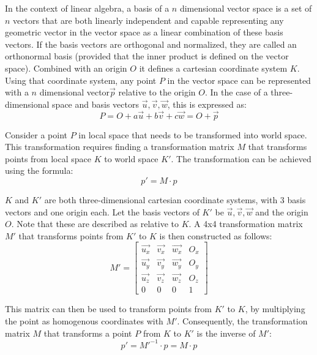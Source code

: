 In the context of linear algebra,
a basis of a $n$ dimensional vector space is a set of $n$ vectors that are both linearly independent
and capable representing any geometric vector in the vector space as a linear combination of these basis vectors.
If the basis vectors are orthogonal and normalized,
they are called an orthonormal basis (provided that the inner product is defined on the vector space).
Combined with an origin $O$ it defines a cartesian coordinate system $K$.
Using that coordinate system, any point $P$ in the vector space can be represented with a $n$ dimensional
vector$\vec{p}$ relative to the origin $O$.
In the case of a three-dimensional space and basis vectors $\vec{u}, \vec{v}, \vec{w}$, this is expressed as:
\begin{equation}
    P = O + a\vec{u} + b\vec{v} + c\vec{w} = O + \vec{p}
\end{equation}

Consider a point $P$ in local space that needs to be transformed into world space.
This transformation requires finding a transformation matrix $M$ that transforms points
from local space $K$ to world space $K'$.
The transformation can be achieved using the formula:
\begin{equation}
    p' = M\cdot p
\end{equation}

$K$ and $K'$ are both three-dimensional cartesian coordinate systems, with 3 basis vectors and one origin each.
Let the basis vectors of $K'$ be $\vec{u}, \vec{v}, \vec{w}$ and the origin $O$.
Note that these are described as relative to $K$.
A 4x4 transformation matrix $M'$ that transforms points from $K'$ to $K$ is then constructed as follows:
\begin{equation}
    M' = \begin{bmatrix}
             \vec{u_x} & \vec{v_x} & \vec{w_x} & O_x \\
             \vec{u_y} & \vec{v_y} & \vec{w_y} & O_y \\
             \vec{u_z} & \vec{v_z} & \vec{w_z} & O_z \\
             0         & 0         & 0         & 1
    \end{bmatrix}
\end{equation}

This matrix can then be used to transform points from $K'$ to $K$, by multiplying the point as homogenous coordinates with $M'$.
Consequently, the transformation matrix $M$ that transforms a point $P$ from $K$ to $K'$ is the inverse of $M'$:
\begin{equation}
    p' = M'^{-1} \cdot p = M\cdot p
\end{equation}

